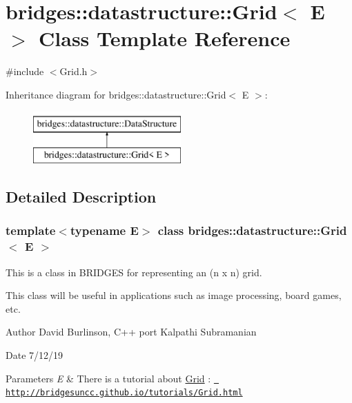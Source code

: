 \hypertarget{classbridges_1_1datastructure_1_1_grid}{}\section{bridges\+::datastructure\+::Grid$<$ E $>$ Class Template Reference}
\label{classbridges_1_1datastructure_1_1_grid}


{\ttfamily \#include $<$Grid.\+h$>$}

Inheritance diagram for bridges\+::datastructure\+::Grid$<$ E $>$\+:\begin{figure}[H]
\begin{center}
\leavevmode
\includegraphics[height=2.000000cm]{classbridges_1_1datastructure_1_1_grid}
\end{center}
\end{figure}


\subsection{Detailed Description}
\subsubsection*{template$<$typename E$>$\newline
class bridges\+::datastructure\+::\+Grid$<$ E $>$}

This is a class in B\+R\+I\+D\+G\+ES for representing an (n x n) grid. 

This class will be useful in applications such as image processing, board games, etc.

\begin{DoxyAuthor}{Author}
David Burlinson, C++ port Kalpathi Subramanian 
\end{DoxyAuthor}
\begin{DoxyDate}{Date}
7/12/19
\end{DoxyDate}

\begin{DoxyParams}{Parameters}
{\em E} & There is a tutorial about \mbox{\hyperlink{classbridges_1_1datastructure_1_1_grid}{Grid}} \+: \href{http://bridgesuncc.github.io/tutorials/Grid.html}{\texttt{ http\+://bridgesuncc.\+github.\+io/tutorials/\+Grid.\+html}} \\
\hline
\end{DoxyParams}
